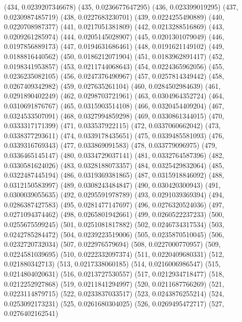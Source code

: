 {					(434, 0.0239207346678)
					(435, 0.0236677647295)
					(436, 0.023399019295)
					(437, 0.0230987485719)
					(438, 0.0227683230701)
					(439, 0.0224255490889)
					(440, 0.0220708987377)
					(441, 0.0217051381809)
					(442, 0.0213288516869)
					(443, 0.0209261285974)
					(444, 0.0205145028907)
					(445, 0.0201301079049)
					(446, 0.0197856889173)
					(447, 0.0194631686461)
					(448, 0.0191621149102)
					(449, 0.0188816440562)
					(450, 0.0186212071904)
					(451, 0.0183962891417)
					(452, 0.0198341953857)
					(453, 0.0211744068643)
					(454, 0.0224365962056)
					(455, 0.0236235082105)
					(456, 0.0247376490967)
					(457, 0.0257814349442)
					(458, 0.0267409342982)
					(459, 0.027635261104)
					(460, 0.0284502984639)
					(461, 0.0291890402249)
					(462, 0.0298703721961)
					(463, 0.0304964352724)
					(464, 0.0310691876767)
					(465, 0.0315903514108)
					(466, 0.0320454409204)
					(467, 0.0324533507091)
					(468, 0.0327994859298)
					(469, 0.0330861344015)
					(470, 0.0333317171399)
					(471, 0.033537922115)
					(472, 0.0337060662042)
					(473, 0.0338377293611)
					(474, 0.0339178435651)
					(475, 0.0339485581093)
					(476, 0.0339316769343)
					(477, 0.033869091583)
					(478, 0.033779096975)
					(479, 0.0336465145147)
					(480, 0.0334729037141)
					(481, 0.0332764587396)
					(482, 0.0330581624026)
					(483, 0.0328188073357)
					(484, 0.0325429832064)
					(485, 0.0322487445194)
					(486, 0.0319369381865)
					(487, 0.0315918846092)
					(488, 0.0312150583997)
					(489, 0.0308243484847)
					(490, 0.030420300943)
					(491, 0.0300039055635)
					(492, 0.0295591978789)
					(493, 0.0291039369394)
					(494, 0.0286387427583)
					(495, 0.0281477147697)
					(496, 0.0276320524036)
					(497, 0.0271094374462)
					(498, 0.0265801942661)
					(499, 0.0260522237233)
					(500, 0.0255675599245)
					(501, 0.0251081817882)
					(502, 0.0246734317534)
					(503, 0.0242785284472)
					(504, 0.0239223519006)
					(505, 0.0235870510045)
					(506, 0.0232720732034)
					(507, 0.022976579694)
					(508, 0.0227000770957)
					(509, 0.0224581039695)
					(510, 0.0222332097374)
					(511, 0.0220409680331)
					(512, 0.021880342713)
					(513, 0.0217338060185)
					(514, 0.0216006986547)
					(515, 0.0214804020631)
					(516, 0.0213727530557)
					(517, 0.0212934718477)
					(518, 0.0212252927868)
					(519, 0.0211841294997)
					(520, 0.0211687766269)
					(521, 0.0223114879715)
					(522, 0.0233837033517)
					(523, 0.0243876255214)
					(524, 0.0253092173231)
					(525, 0.0261680304025)
					(526, 0.0269495472717)
					(527, 0.0276402162541)
}
